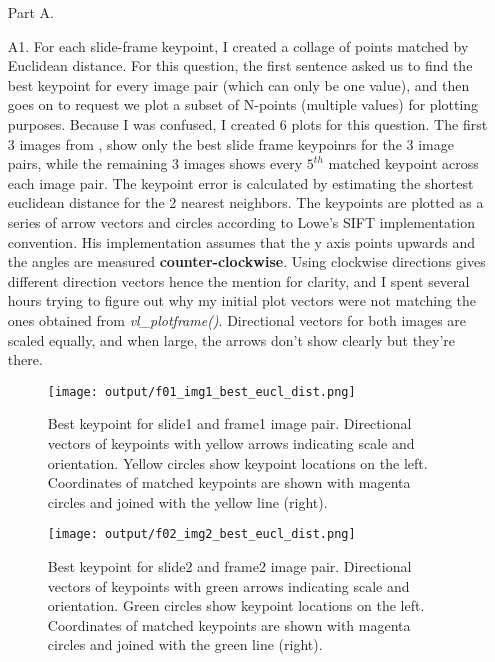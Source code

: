 \documentclass[12pt]{report}
\begin{document}
\begin{enumerate}

    \item[Part A.]
    \item[A1.]  For each slide-frame keypoint, I created a collage of points matched by Euclidean distance. For this question, the first sentence asked us to find the best 
    keypoint for every image pair (which can only be one value), and then goes on to request we plot a subset of N-points (multiple values) for plotting purposes. Because I 
    was confused, I created 6 plots for this question. The first 3 images from , show only the best slide frame keypoinrs for the 
    3 image pairs, while the remaining 3 images  shows every $5^{th}$ matched keypoint across each image pair. The keypoint error 
    is calculated by estimating the shortest euclidean distance for the 2 nearest neighbors. The keypoints are plotted as a series of arrow vectors and circles according to 
    Lowe's SIFT implementation convention. His implementation assumes that the y axis points upwards and the angles are measured \textbf{counter-clockwise}. Using clockwise 
    directions gives different direction vectors hence the mention for clarity, and I spent several hours trying to figure out why my initial plot vectors were not matching 
    the ones obtained from \emph{vl\_plotframe()}. Directional vectors for both images are scaled equally, and when large, the arrows don't show clearly but they're there.

    \begin{figure}[H]
        \centering
        \texttt{[image: output/f01\_img1\_best\_eucl\_dist.png]}
        \caption{Best keypoint for slide1 and frame1 image pair. Directional vectors of keypoints with yellow arrows indicating scale and orientation. Yellow circles 
        show keypoint locations on the left. Coordinates of matched keypoints are shown with magenta circles and joined with the yellow line (right).}
        \label{fig:Figure1}
    \end{figure}

    \begin{figure}[H]
        \centering
        \texttt{[image: output/f02\_img2\_best\_eucl\_dist.png]}
        \caption{Best keypoint for slide2 and frame2 image pair. Directional vectors of keypoints with green arrows indicating scale and orientation. Green circles 
        show keypoint locations on the left. Coordinates of matched keypoints are shown with magenta circles and joined with the green line (right).}
        \label{fig:Figure2}
    \end{figure}


\end{enumerate}
\end{document}
